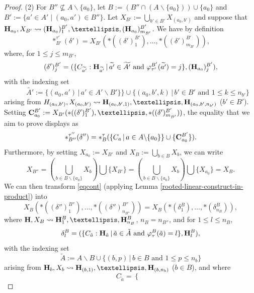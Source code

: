 \documentclass[11pt]{article}
\theoremstyle{definition}
\numberwithin{equation}{section}
\numberwithin{equation}{section}
\newcommand{\inc}{\subseteq}
\newcommand{\set}[1]{\{#1\}}
\newcommand{\setc}[2]{\set{#1 \mid #2}}
\newcommand{\union}{\cup}		%
\newcommand{\inter}{\cap}		%
\newcommand{\hyper}[1]{{\bf #1}}
\begin{document}
\begin{proof}
\medskip\noindent
(2) For $B''\not\inc A\backslash\set{a_0}$, let  ${B}:=(B''\inter(A\backslash\set{a_0}))\union \set{a_0}$ and ${B'}:=\setc{a'\in A'}{(a_0,a')\in B''}$.   Let $X_{{B'}}:=\bigcup_{b'\in {B'}} X_{(a_0,b')}$ and suppose that  ${\bf H}_{a_0}, X_{{B'}}\leadsto (\hyper{H}_{a_0})_1^{{B'}},\dots,(\hyper{H}_{a_0})^{{B'}}_{m_{{B'}}}$.  We have by definition
$$\ast_{B'}^{\tau'}(\delta')=X_{{B'}}(\ast((\delta')^{{B'}}_1),\dots,\ast((\delta')^{{B'}}_{m_{{B'}}})),$$
where, for $1\leq j\leq m_{{B'}}$, 
$$(\delta')^{{B'}}_{j}=(\{C_{\widetilde{a'}}:{\bf H}_{\widetilde{a'}}\,|\, \widetilde{a'}\in \widetilde{A'} \mbox{ and } \varphi_{\tau'}^{{B'}}(\widetilde{a'})=j\},({\bf H}_{a_0})^{{B'}}_{j}),$$
with the indexing set 
$$\quad\quad\widetilde{A'}:=\{(a_0,a')\,|  \,a'\in A'\backslash B'\}\} 
\cup \{(a_0,b',k)\,|\, b'\in B' \text{ and } 1\leq k\leq n_{b'}\}$$
arising from  $H_{(a_0,b')}, X_{(a_0,b')}\leadsto \hyper{H}_{(a_0,b',1)},\dots,\hyper{H}_{(a_0,b',n_{b'})}$ ($b'\in B'$). Setting  ${\bf C}^{B'}_{a_0}:=X_{B'}(\ast((\delta')^{B'}_1),\dots,\ast((\delta')^{B'}_{m_{B'}}))$, the equality that we aim to prove displays as  
\begin{equation}
\label{eqcont}
\ast_{B''}^{\tau''}(\delta'')=\ast_{B}^{\tau}(\{C_a\,|\, a\in A\backslash\{a_0\}\}\cup\{{\bf C}^{B'}_{a_0}\}).
\end{equation}
Furthermore, by setting $X_{a_0}:=X_{{B'}}$ and $X_{{B}}:= \bigcup_{b\in {B}}X_b$, we can write 
$$X_{B''}=(\bigcup_{b\in {B}\backslash\{a_0\}}X_b)\bigcup \set{X_{{B'}}}= (\bigcup_{b\in {B}\backslash\{a_0\}}X_b)\bigcup \set{X_{a_0}} =
X_{{B}}.$$
We can then  transform \eqref{eqcont}  (applying Lemma \ref{rooted-linear-construct-in-product})
into 
\begin{equation}
X_{B}(\ast((\delta'')^{B''}_1),\dots,\ast((\delta'')^{B''}_{n_{B''}}))=  
X_{{B}}(\ast(\delta^{{B}}_1),\dots,\ast(\delta^{{B}}_{n_{{B}}})),
\end{equation}
where
${\bf H}, X_{{B}}\leadsto \hyper{H}_1^{{B}},\dots,\hyper{H}^{{B}}_{n_{{B}}}$, $n_{{B}}=n_{B''}$, and
for $1\leq l\leq n_{{B}}$, 
$$\delta^B_l=(\{C_{\tilde{a}}:{\bf H}_{\tilde{a}}\,|\, \tilde{a}\in\tilde{A} \mbox{ and } \varphi_{\tau}^{{B}}(\tilde{a})=l\},{\bf H}^{{B}}_l),$$
with the indexing set 
$$\tilde{A}:=A\backslash {B}\cup\{(b,p)\,|\, b\in {B} \mbox{ and } 1\leq p\leq n_b\}$$
arising from ${\bf H}_b, X_b\leadsto \hyper{H}_{(b,1)},\dots,\hyper{H}_{(b,n_b)}$ ($b\in {B}$),
and where 
$$C_{\tilde{a}}=\begin{cases}

\end{cases}$$
\end{proof}
\end{document}

